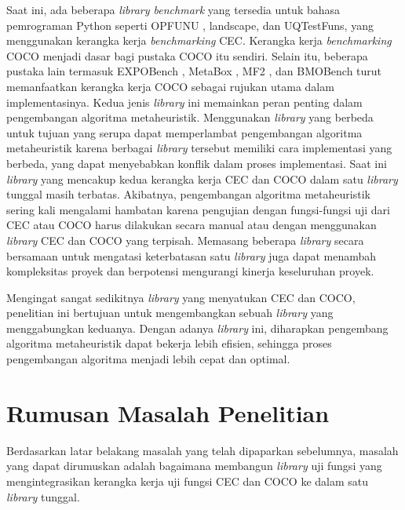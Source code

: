 Saat ini, ada beberapa \textit{library benchmark} yang tersedia untuk bahasa pemrograman Python seperti OPFUNU \citep{Van_Thieu_2024}, landscape, dan UQTestFuns, yang menggunakan kerangka kerja \textit{benchmarking} CEC. Kerangka kerja \textit{benchmarking} COCO \citep{pro_1999} menjadi dasar bagi pustaka COCO itu sendiri. Selain itu, beberapa pustaka lain termasuk EXPOBench \citep{Bliek_2023}, MetaBox \citep{ma_zeyan_guo_chen_jiacheng_zhenrui_peng_gong_ma_cao_2023}, MF2 \citep{van_Rijn_2020}, dan BMOBench \citep{al-dujaili_2016} turut memanfaatkan kerangka kerja COCO sebagai rujukan utama dalam implementasinya. Kedua jenis \textit{library} ini memainkan peran penting dalam pengembangan algoritma metaheuristik. Menggunakan \textit{library} yang berbeda untuk tujuan yang serupa dapat memperlambat pengembangan algoritma metaheuristik karena berbagai \textit{library} tersebut memiliki cara implementasi yang berbeda, yang dapat menyebabkan konflik dalam proses implementasi. Saat ini \textit{library} yang mencakup kedua kerangka kerja CEC dan COCO dalam satu \textit{library} tunggal masih terbatas. Akibatnya, pengembangan algoritma metaheuristik sering kali mengalami hambatan karena pengujian dengan fungsi-fungsi uji dari CEC atau COCO harus dilakukan secara manual atau dengan menggunakan \textit{library} CEC dan COCO yang terpisah. Memasang beberapa \textit{library} secara bersamaan untuk mengatasi keterbatasan satu \textit{library} juga dapat menambah kompleksitas proyek dan berpotensi mengurangi kinerja keseluruhan proyek.

Mengingat sangat sedikitnya \textit{library} yang menyatukan CEC dan COCO, penelitian ini bertujuan untuk mengembangkan sebuah \textit{library} yang menggabungkan keduanya. Dengan adanya \textit{library} ini, diharapkan pengembang algoritma metaheuristik dapat bekerja lebih efisien, sehingga proses pengembangan algoritma menjadi lebih cepat dan optimal.

\section{Rumusan Masalah Penelitian}
Berdasarkan latar belakang masalah yang telah dipaparkan sebelumnya, masalah yang dapat dirumuskan adalah bagaimana membangun \textit{library} uji fungsi yang mengintegrasikan kerangka kerja uji fungsi CEC dan COCO ke dalam satu \textit{library} tunggal.


